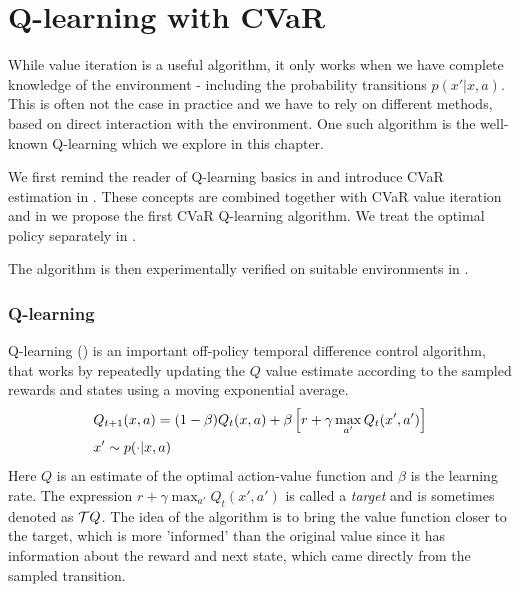 \chapter{Q-learning with CVaR}\label{ch:qlearning}

While value iteration is a useful algorithm, it only works when we have complete knowledge of the environment - including the probability transitions $p(x'|x,a)$. This is often not the case in practice and we have to rely on different methods, based on direct interaction with the environment. One such algorithm is the well-known Q-learning which we explore in this chapter.

We first remind the reader of Q-learning basics in  and introduce CVaR estimation in . These concepts are combined together with CVaR value iteration and in  we propose the first CVaR Q-learning algorithm. We treat the optimal policy separately in .

The algorithm is then experimentally verified on suitable environments in .

\subsection{Q-learning}\label{sec:qlearning}

Q-learning (\citet{watkins1992q}) is an important off-policy temporal difference control algorithm, that works by repeatedly updating the $Q$ value estimate according to the sampled rewards and states using a moving exponential average.
\begin{equation}
\begin{split}
&Q_{t+1}(x, a) = (1-\beta)Q_{t}(x, a) + \beta\left[ {r + \gamma \max_{a'} Q_t(x', a')} \right]\\
&x' \sim p(\cdot|x, a)
\end{split}
\end{equation}
Here $Q$ is an estimate of the optimal action-value function  and $\beta$ is the learning rate. The expression $r + \gamma \max_{a'} Q_t(x', a')$ is called a \textit{target} and is sometimes denoted as $\mathcal{T} Q$. The idea of the algorithm is to bring the value function closer to the target, which is more 'informed' than the original value since it has information about the reward and next state, which came directly from the sampled transition.


